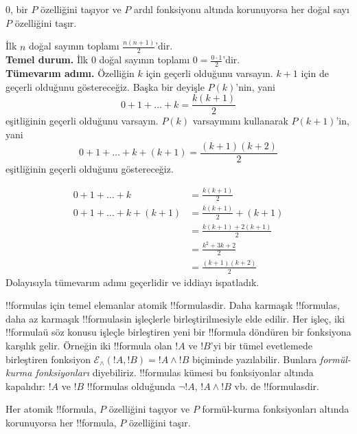 \documentclass[../../../include/open-logic-section]{subfiles}
\begin{document}
\begin{defn}
$0$, bir $P$ özelliğini taşıyor ve $P$ ardıl fonksiyonu altında korunuyorsa
her doğal sayı $P$ özelliğini taşır.
\end{defn}

\begin{ex} İlk $n$ doğal sayının toplamı $\frac{n(n+1)}{2}$'dir. \\

\textbf{Temel durum.} İlk $0$ doğal sayının toplamı
$0=\frac{0\cdot 1}{2}$'dir.\\

\textbf{Tümevarım adımı.} Özelliğin $k$ için geçerli olduğunu varsayın.
$k+1$ için de geçerli olduğunu göstereceğiz. Başka bir deyişle $P(k)$'nin,
yani
\[ 0 + 1 + \ldots + k = \frac{k(k+1)}{2} \]
eşitliğinin geçerli olduğunu varsayın. $P(k)$ varsayımını kullanarak
$P(k+1)$'in, yani
\[ 0 + 1 + \ldots + k + (k+1) = \frac{(k+1)(k+2)}{2} \]
eşitliğinin geçerli olduğunu göstereceğiz.

\begin{align*}
0 + 1 + \ldots + k &= \frac{k(k+1)}{2} \tag{Varsayım} \\
0 + 1 + \ldots + k + (k+1) &= \frac{k(k+1)}{2} + (k+1)
\tag{Her iki tarafa $k+1$ ekleyin} \\
&= \frac{k(k+1) + 2(k+1)}{2} \\
&= \frac{k^2 + 3k +2}{2} \\
&=\frac{(k+1)(k+2)}{2}
\end{align*}
Dolayısıyla tümevarım adımı geçerlidir ve iddiayı ispatladık.
\end{ex}

\begin{explain}
!!{formula}s için temel elemanlar atomik !!{formula}s{}dir. Daha karmaşık
!!{formula}s, daha az karmaşık !!{formula}s{}in işleçlerle birleştirilmesiyle
elde edilir. Her işleç, iki !!{formula}{}ü söz konusu işleçle birleştiren yeni
bir !!{formula} döndüren bir fonksiyona karşılık gelir. Örneğin iki
!!{formula} olan $!A$ ve $!B$'yi bir tümel evetlemede birleştiren fonksiyon
$\mathcal E _\land (!A, !B) = !A \land !B$ biçiminde yazılabilir. Bunlara
\emph{formül-kurma fonksiyonları} diyebiliriz. !!{formula}s kümesi bu
fonksiyonlar altında kapalıdır: $!A$ ve $!B$ !!{formula}s olduğunda
$\lnot !A$, $!A \land !B$ vb. de !!{formula}s{}dir.
\end{explain}

\begin{defn}
Her atomik !!{formula}, $P$ özelliğini taşıyor ve $P$ formül-kurma
fonksiyonları altında korunuyorsa her !!{formula}, $P$ özelliğini taşır.
\end{defn}
\end{document}

